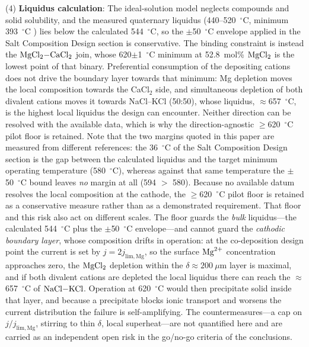 \documentclass[pdflatex,sn-basic,Numbered]{sn-jnl}
\begin{document}
(4) \textbf{Liquidus calculation}: The ideal-solution model neglects compounds and solid solubility, and the measured quaternary liquidus (440--520~$^{\circ}$C, minimum 393~$^{\circ}$C \cite{hattori1985}) lies below the calculated 544~$^{\circ}$C, so the $\pm$50~$^{\circ}$C envelope applied in the Salt Composition Design section is conservative. The binding constraint is instead the $\ce{MgCl2-CaCl2}$ join, whose 620$\pm$1~$^{\circ}$C minimum at 52.8~mol\% $\ce{MgCl2}$ \cite{grjotheim1970} is the lowest point of that binary. Preferential consumption of the depositing cations does not drive the boundary layer towards that minimum: Mg depletion moves the local composition towards the CaCl$_2$ side, and simultaneous depletion of both divalent cations moves it towards NaCl--KCl (50:50), whose liquidus, $\approx$657~$^{\circ}$C, is the highest local liquidus the design can encounter. Neither direction can be resolved with the available data, which is why the direction-agnostic $\geq$620~$^{\circ}$C pilot floor is retained. Note that the two margins quoted in this paper are measured from different references: the 36~$^{\circ}$C of the Salt Composition Design section is the gap between the calculated liquidus and the target minimum operating temperature (580~$^{\circ}$C), whereas against that same temperature the $\pm$50~$^{\circ}$C bound leaves \emph{no} margin at all (594 $>$ 580). Because no available datum resolves the local composition at the cathode, the $\geq$620~$^{\circ}$C pilot floor is retained as a conservative measure rather than as a demonstrated requirement. That floor and this risk also act on different scales. The floor guards the \emph{bulk} liquidus---the calculated 544~$^{\circ}$C plus the $\pm$50~$^{\circ}$C envelope---and cannot guard the \emph{cathodic boundary layer}, whose composition drifts in operation: at the co-deposition design point the current is set by $j = 2j_{\mathrm{lim,Mg}}$, so the surface $\ce{Mg^{2+}}$ concentration approaches zero, the $\ce{MgCl2}$ depletion within the $\delta \approx 200~\mu$m layer is maximal, and if both divalent cations are depleted the local liquidus there can reach the $\approx$657~$^{\circ}$C of $\ce{NaCl-KCl}$. Operation at 620~$^{\circ}$C would then precipitate solid inside that layer, and because a precipitate blocks ionic transport and worsens the current distribution the failure is self-amplifying. The countermeasures---a cap on $j/j_{\mathrm{lim,Mg}}$, stirring to thin $\delta$, local superheat---are not quantified here and are carried as an independent open risk in the go/no-go criteria of the conclusions.
\end{document}
